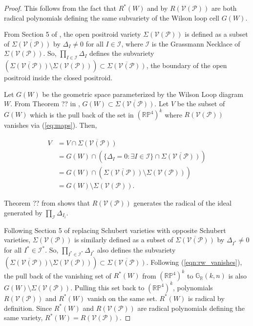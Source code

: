 \documentclass[11pt]{article}
\newcommand{\R}{\mathbb{R}}
\newcommand{\Grall}{\mathbb{G}_{\R}}
\newcommand{\cP}{\mathcal{P}}
\newcommand{\cV}{\mathcal{V}}
\newcommand{\VP}{\cV(\cP)}
\theoremstyle{remark}
\theoremstyle{definition}
\begin{document}
\begin{proof}
This follows from the fact that $R^{\ast}(W)$ and by $R(\VP)$ are both radical polynomials defining the same subvariety of the Wilson loop cell $G(W)$. 

From Section 5 of \cite{knutsonlamspeyerjuggling}, the open positroid variety $\Sigma(\VP)$ is defined as a subset of $\overline{\Sigma(\VP)}$ by $\Delta_I \neq 0$ for all $I \in \mathcal{I}$, where $\mathcal{I}$ is the Grassmann Necklace of $\Sigma(\VP)$. So, $\prod_{I \in \mathcal{I}} \Delta_I$ defines the subvariety $(\overline{\Sigma(\VP)} \setminus \Sigma(\VP)) \subset \overline{\Sigma(\VP)}$, the boundary of the open positroid inside the closed positroid. 

Let $G(W)$ be the geometric space parameterized by the Wilson Loop diagram $W$. From Theorem ?? in \cite{basisshapeloc}, $G(W) \subset \overline{\Sigma(\VP)}$. Let $V$ be the subset of $G(W)$ which is the pull back of the set in $(\mathbb{RP}^{4})^{k}$ where $R(\VP)$ vanishes via (\ref{eq:maps}). Then,

%
\begin{equation} \label{eqn:rw_vanishes}
\begin{split}
V & = V \cap \overline{\Sigma(\VP)} \\
& = G(W) \cap (\{\Delta_I = 0 : \exists I \in \mathcal{I}\} \cap \overline{\Sigma(\VP)}) \\
& = G(W) \cap (\overline{\Sigma(\VP)} \setminus \Sigma(\VP)) \\
& = G(W) \setminus \Sigma(\VP).
\end{split}
\end{equation}

Theorem ?? from \cite{generalcombinatorics2} shows that $R(\VP)$ generates the radical of the ideal generated by $\prod_\mathcal{I} \Delta_{I_i}$.

Following Section 5 of \cite{knutsonlamspeyerjuggling} replacing Schubert varieties with opposite Schubert varieties, $\Sigma(\VP)$ is similarly defined as a subset of $\overline{\Sigma(\VP)}$ by $\Delta_{I^{\ast}} \neq 0$ for all $I^{\ast} \in \mathcal{I}^{\ast}$. So, $\prod_{I^{\ast} \in \mathcal{I}^{\ast}} \Delta_{I^{\ast}}$ also defines the subvariety $(\overline{\Sigma(\VP)} \setminus \Sigma(\VP)) \subset \overline{\Sigma(\VP)}$. Following (\ref{eqn:rw_vanishes}), the pull back of the vanishing set of $R^{\ast}(W)$ from $(\mathbb{RP}^4)^{k}$ to $\Grall(k,n)$ is also $G(W) \setminus \Sigma(\VP)$. Pulling this set back to $(\mathbb{RP}^4)^{k}$, polynomials $R(\VP)$ and $R^{\ast}(W)$ vanish on the same set. $R^{\ast}(W)$ is radical by definition. Since $R^{\ast}(W)$ and $R(\VP)$ are radical polynomials defining the same variety, $R^{\ast}(W) = R(\VP)$.
\end{proof}
\end{document}
